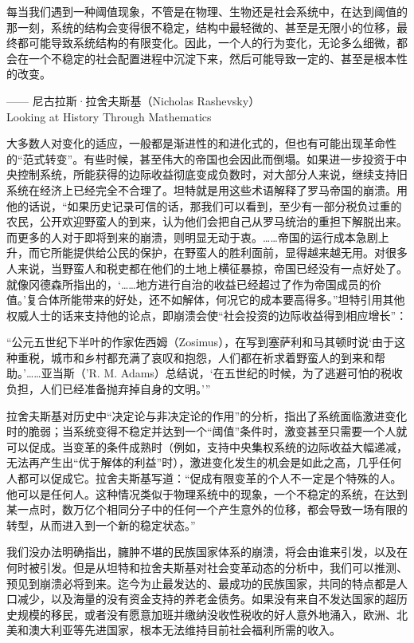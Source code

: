 \begin{tcolorbox}
\kaishu 每当我们遇到一种阈值现象，不管是在物理、生物还是社会系统中，在达到阈值的那一刻，系统的结构会变得很不稳定，结构中最轻微的、甚至是无限小的位移，最终都可能导致系统结构的有限变化。因此，一个人的行为变化，无论多么细微，都会在一个不稳定的社会配置进程中沉淀下来，然后可能导致一定的、甚至是根本性的改变。
\begin{flushright}
—— 尼古拉斯·拉舍夫斯基（Nicholas Rashevsky）\\ Looking at History Through Mathematics
\end{flushright}
\end{tcolorbox}

大多数人对变化的适应，一般都是渐进性的和进化式的，但也有可能出现革命性的“范式转变”。有些时候，甚至伟大的帝国也会因此而倒塌。如果进一步投资于中央控制系统，所能获得的边际收益彻底变成负数时，对大部分人来说，继续支持旧系统在经济上已经完全不合理了。坦特就是用这些术语解释了罗马帝国的崩溃。用他的话说，“如果历史记录可信的话，那我们可以看到，至少有一部分税负过重的农民，公开欢迎野蛮人的到来，认为他们会把自己从罗马统治的重担下解脱出来。而更多的人对于即将到来的崩溃，则明显无动于衷。……帝国的运行成本急剧上升，而它所能提供给公民的保护，在野蛮人的胜利面前，显得越来越无用。对很多人来说，当野蛮人和税吏都在他们的土地上横征暴掠，帝国已经没有一点好处了。就像冈德森所指出的，‘……地方进行自治的收益已经超过了作为帝国成员的价值。’复合体所能带来的好处，还不如解体，何况它的成本要高得多。”坦特引用其他权威人士的话来支持他的论点，即崩溃会使“社会投资的边际收益得到相应增长”：

“公元五世纪下半叶的作家佐西姆（Zosimus），在写到塞萨利和马其顿时说‘由于这种重税，城市和乡村都充满了哀叹和抱怨，人们都在祈求着野蛮人的到来和帮助。’……亚当斯（'R. M. Adams）总结说，‘在五世纪的时候，为了逃避可怕的税收负担，人们已经准备抛弃掉自身的文明。’” 

拉舍夫斯基对历史中“决定论与非决定论的作用”的分析，指出了系统面临激进变化时的脆弱；当系统变得不稳定并达到一个“阈值”条件时，激变甚至只需要一个人就可以促成。当变革的条件成熟时（例如，支持中央集权系统的边际收益大幅递减，无法再产生出“优于解体的利益”时），激进变化发生的机会是如此之高，几乎任何人都可以促成它。拉舍夫斯基写道：“促成有限变革的个人不一定是个特殊的人。他可以是任何人。这种情况类似于物理系统中的现象，一个不稳定的系统，在达到某一点时，数万亿个相同分子中的任何一个产生意外的位移，都会导致一场有限的转型，从而进入到一个新的稳定状态。”

我们没办法明确指出，臃肿不堪的民族国家体系的崩溃，将会由谁来引发，以及在何时被引发。但是从坦特和拉舍夫斯基对社会变革动态的分析中，我们可以推测、预见到崩溃必将到来。迄今为止最发达的、最成功的民族国家，共同的特点都是人口减少，以及海量的没有资金支持的养老金债务。如果没有来自不发达国家的超历史规模的移民，或者没有愿意加班并缴纳没收性税收的好人意外地涌入，欧洲、北美和澳大利亚等先进国家，根本无法维持目前社会福利所需的收入。

